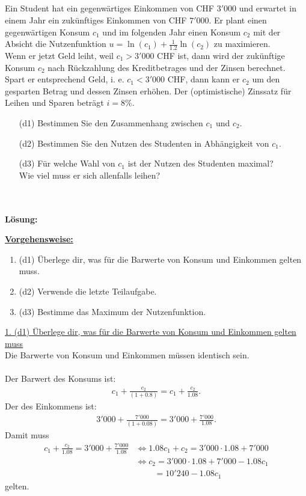 \subsection*{}
Ein Student hat ein gegenwärtiges Einkommen von CHF $ 3'000 $ und erwartet in einem Jahr ein zukünftiges Einkommen von CHF $ 7'000 $. Er plant einen gegenwärtigen Konsum $ c_1 $ und im
folgenden Jahr einen Konsum $ c_2 $ mit der Absicht die Nutzenfunktion $ u = \ln(c_1) + \frac{1}{1.2}
\ln(c_2) $ zu maximieren.\\
Wenn er jetzt Geld leiht, weil $ c_1 > 3'000 $ CHF ist, dann wird der zukünftige Konsum $ c_2 $ nach
Rückzahlung des Kreditbetrages und der Zinsen berechnet. Spart er entsprechend Geld, i. e.
$ c_1 < 3'000 $ CHF, dann kann er $ c_2 $ um den gesparten Betrag und dessen Zinsen erhöhen. Der (optimistische)
Zinssatz für Leihen und Sparen beträgt $ i = 8\% $.
\begin{enumerate}
	\item[(d1)] Bestimmen Sie den Zusammenhang zwischen $ c_1 $ und $ c_2 $.
	\item[(d2)] Bestimmen Sie den Nutzen des Studenten in Abhängigkeit von $ c_1 $.
	\item[(d3)] Für welche Wahl von $ c_1 $ ist der Nutzen des Studenten maximal?\\
	Wie viel muss er sich allenfalls leihen? 
\end{enumerate}
\ \\
\\
\textbf{Lösung:}
\begin{mdframed}
	\underline{\textbf{Vorgehensweise:}}
	\begin{enumerate}
		\item (d1) Überlege dir, was für die Barwerte von Konsum und Einkommen gelten muss.
		\item 
		(d2) 
		Verwende die letzte Teilaufgabe.
		\item 
		(d3) Bestimme das Maximum der Nutzenfunktion.
	\end{enumerate}
\end{mdframed}

\underline{1. (d1) Überlege dir, was für die Barwerte von Konsum und Einkommen gelten muss}\\
Die Barwerte von Konsum und Einkommen müssen identisch sein.\\
\\
Der Barwert des Konsums ist: 
\begin{align*}
c_1 + \frac{c_2}{(1+0.8)}= c_1 + \frac{c_2}{1.08}.
\end{align*}
Der des Einkommens ist:
\begin{align*}
3'000 + \frac{7'000}{(1+0.08)}
=
3'000 + \frac{7'000}{1.08}.
\end{align*}
Damit muss 
\begin{align*}
c_1 + \frac{c_2}{1.08}
=
3'000 + \frac{7'000}{1.08}
&\Leftrightarrow
1.08 c_1 + c_2 = 3'000 \cdot 1.08 + 7'000\\
&\Leftrightarrow
c_2 = 3'000 \cdot 1.08 + 7'000 - 1.08 c_1 \\
&\quad \quad  \ = 10'240 - 1.08 c_1
\end{align*}
gelten.\\

